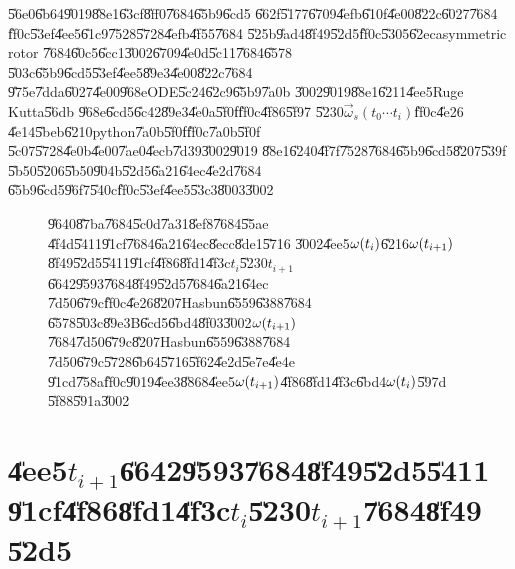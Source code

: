 \documentclass[12pt,a4paper]{article}
\begin{document}
\U{56e0}\U{6b64}\U{9019}\U{88e1}\U{63cf}\U{8ff0}\U{7684}\U{65b9}\U{6cd5}%
\U{662f}\U{5177}\U{6709}\U{4efb}\U{610f}\U{4e00}\U{822c}\U{6027}\U{7684}%
\U{ff0c}\U{53ef}\U{4ee5}\U{61c9}\U{7528}\U{5728}\U{4efb}\U{4f55}\U{7684}%
\U{525b}\U{9ad4}\U{8f49}\U{52d5}\U{ff0c}\U{5305}\U{62ec}asymmetric rotor%
\U{7684}\U{60c5}\U{6cc1}\U{3002}\U{6709}\U{4e0d}\U{5c11}\U{7684}\U{6578}%
\U{503c}\U{65b9}\U{6cd5}\U{53ef}\U{4ee5}\U{89e3}\U{4e00}\U{822c}\U{7684}%
\U{975e}\U{7dda}\U{6027}\U{4e00}\U{968e}ODE\U{5c24}\U{62c9}\U{65b9}\U{7a0b}%
\cite{matlab}\U{3002}\U{9019}\U{88e1}\U{6211}\U{4ee5}Ruge Kutta\U{56db}%
\U{968e}\U{6cd5}\U{6c42}\U{89e3}\U{4e0a}\U{5f0f}\U{ff0c}\U{4f86}\U{5f97}%
\U{5230}$\vec{\omega}_{s}\left( t_{0}\cdots t_{i}\right) $\U{ff0c}\U{4e26}%
\U{4e14}\U{5beb}\U{6210}python\U{7a0b}\U{5f0f}\U{ff0c}\U{7a0b}\U{5f0f}%
\U{5c07}\U{5728}\U{4e0b}\U{4e00}\U{7ae0}\U{4ecb}\U{7d39}\U{3002}\U{9019}%
\U{88e1}\U{6240}\U{4f7f}\U{7528}\U{7684}\U{65b9}\U{6cd5}\U{8207}\U{539f}%
\U{5b50}\U{5206}\U{5b50}\U{904b}\U{52d5}\U{6a21}\U{64ec}\U{4e2d}\U{7684}%
\U{65b9}\U{6cd5}\U{96f7}\U{540c}\U{ff0c}\U{53ef}\U{4ee5}\U{53c3}\U{8003}\cite%
{rapaport}\U{3002}

\begin{figure}[th]
\caption{\U{9640}\U{87ba}\U{7684}\U{5c0d}\U{7a31}\U{8ef8}\U{7684}\U{55ae}%
\U{4f4d}\U{5411}\U{91cf}\U{7684}\U{6a21}\U{64ec}\U{8ecc}\U{8de1}\U{5716}%
\U{3002}\U{4ee5}$\protect\omega (t_{i})$\U{6216}$\protect\omega (t_{i+1})$%
\U{8f49}\U{52d5}\U{5411}\U{91cf}\U{4f86}\U{8fd1}\U{4f3c}$t_{i}$\U{5230}$%
t_{i+1}$\U{6642}\U{9593}\U{7684}\U{8f49}\U{52d5}\U{7684}\U{6a21}\U{64ec}%
\U{7d50}\U{679c}\U{ff0c}\U{4e26}\U{8207}Hasbun\U{6559}\U{6388}\U{7684}%
\U{6578}\U{503c}\U{89e3}B\U{6cd5}\U{6bd4}\U{8f03}\U{3002}$\protect\omega %
(t_{i+1})$\U{7684}\U{7d50}\U{679c}\U{8207}Hasbun\U{6559}\U{6388}\U{7684}%
\U{7d50}\U{679c}\U{5728}\U{6b64}\U{5716}\U{5f62}\U{4e2d}\U{5e7e}\U{4e4e}%
\U{91cd}\U{758a}\U{ff0c}\U{9019}\U{4ee3}\U{8868}\U{4ee5}$\protect\omega %
(t_{i+1})$\U{4f86}\U{8fd1}\U{4f3c}\U{6bd4}$\protect\omega (t_{i})$\U{597d}%
\U{5f88}\U{591a}\U{3002}}
\label{wtiwti1}
\begin{center}
\fbox{}
\end{center}
\end{figure}

\section{\U{4ee5}$t_{i+1}$\U{6642}\U{9593}\U{7684}\U{8f49}\U{52d5}\U{5411}%
\U{91cf}\U{4f86}\U{8fd1}\U{4f3c}$t_{i}$\U{5230}$t_{i+1}$\U{7684}\U{8f49}%
\U{52d5}}
\end{document}
